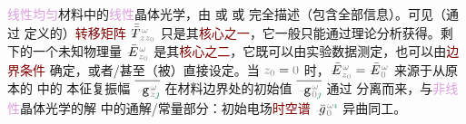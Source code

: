 \textcolor{Plum}{线性}\textcolor{Plum}{均匀}材料中的\textcolor{Plum}{线性}\textcolor{PineGreen}{晶体光学}，由  或  或  完全描述（包含全部信息）。可见（通过  定义的）\textcolor{Maroon}{转移矩阵} $\Xint{\mathcolor{gray}{-}}{30}{\bar{\bar{T}}}^{\;\!\mathcolor{gray}{\omega}}_{\;\! \mathcolor{gray}{z} \mathcolor{gray}{z_0}}$ 只是其\textcolor{Maroon}{核心之一}，它一般只能通过理论分析获得。剩下的一个未知\textcolor{NavyBlue}{物理量} $\Xint{\mathcolor{gray}{-}}{25}{\bar{E}}^{\;\!\mathcolor{gray}{\omega}}_{\;\! \mathcolor{gray}{z_0}}$ 是其\textcolor{Maroon}{核心之二}，它既可以由实验数据测定，也可以由\textcolor{Maroon}{边界条件}  确定，或者/甚至（被）直接设定。当 $\mathcolor{gray}{z_0} = \mathcolor{gray}{0}$ 时，$\Xint{\mathcolor{gray}{-}}{25}{\bar{E}}^{\;\!\mathcolor{gray}{\omega}}_{\;\! \mathcolor{gray}{z_0}} = \Xint{\mathcolor{gray}{-}}{25}{\bar{E}}^{\;\!\mathcolor{gray}{\omega}}_{\;\! \mathcolor{gray}{0}}$ 来源于从原本的  中的 \textcolor{PineGreen}{本征复振幅} $\overline{\Xint{\begin{smallmatrix} ~ \\ {}^{}_{\mathcolor{gray}{-}} \\ ~ \end{smallmatrix}}{09}{\mathtt{g}}^{\;\!\mathcolor{gray}{\omega}}_{\;\! \mathcolor{gray}{z} \textcolor{PineGreen}{\jmath}}}$ 在材料边界处的初始值 $\overline{\Xint{\begin{smallmatrix} ~ \\ {}^{}_{\mathcolor{gray}{-}} \\ ~ \end{smallmatrix}}{09}{\mathtt{g}}^{\;\!\mathcolor{gray}{\omega}}_{\;\! \mathcolor{gray}{0} \textcolor{PineGreen}{\jmath}}}$ 通过  分离而来，与\textcolor{Plum}{非线性}\textcolor{PineGreen}{晶体光学}的解  中的通解/常量部分：初始电场\textcolor{Maroon}{时空谱} $\Xint{{}^{}_{\mathcolor{gray}{-}}}{10}{\bar{g}}^{\;\!\mathcolor{gray}{\omega} \textcolor{PineGreen}{\imath}}_{\;\! \mathcolor{gray}{0}}$ 异曲同工。

\vspace*{-4.5em}

